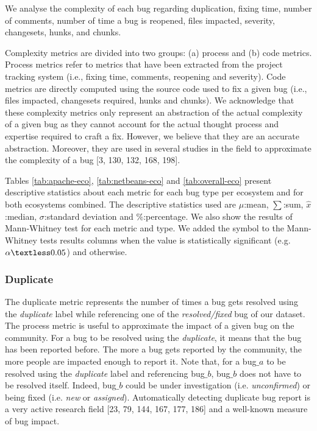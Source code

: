 \documentclass[12pt]{report}
\newcommand{\xmark}{\ding{55}}%
\begin{document}
We analyse the complexity of each bug regarding duplication, fixing
time, number of comments, number of time a bug is reopened, files
impacted, severity, changesets, hunks, and chunks.

Complexity metrics are divided into two groups: (a) process and (b) code
metrics. Process metrics refer to metrics that have been extracted from
the project tracking system (i.e., fixing time, comments, reopening and
severity). Code metrics are directly computed using the source code used
to fix a given bug (i.e., files impacted, changesets required, hunks and
chunks). We acknowledge that these complexity metrics only represent an
abstraction of the actual complexity of a given bug as they cannot
account for the actual thought process and expertise required to craft a
fix. However, we believe that they are an accurate abstraction.
Moreover, they are used in several studies in the field to approximate
the complexity of a bug {[}3, 130, 132, 168, 198{]}.

Tables \ref{tab:apache-eco}, \ref{tab:netbeans-eco} and
\ref{tab:overall-eco} present descriptive statistics about each metric
for each bug type per ecosystem and for both ecosystems combined. The
descriptive statistics used are \(\mu\):mean, \(\sum\):sum,
\(\hat{x}\):median, \(\sigma\):standard deviation and \(\%\):percentage.
We also show the results of Mann-Whitney test for each metric and type.
We added the \checkmark symbol to the Mann-Whitney tests results columns
when the value is statistically significant (e.g.
\(\alpha \textless 0.05\)) and \xmark otherwise.

 


\subsubsection{Duplicate}\label{duplicate}

The duplicate metric represents the number of times a bug gets resolved
using the \emph{duplicate} label while referencing one of the
\emph{resolved/fixed} bug of our dataset. The process metric is useful
to approximate the impact of a given bug on the community. For a bug to
be resolved using the \emph{duplicate}, it means that the bug has been
reported before. The more a bug gets reported by the community, the more
people are impacted enough to report it. Note that, for a bug\(\_a\) to
be resolved using the \emph{duplicate} label and referencing bug\(\_b\),
bug\(\_b\) does not have to be resolved itself. Indeed, bug\(\_b\) could
be under investigation (i.e. \emph{unconfirmed}) or being fixed (i.e.
\emph{new} or \emph{assigned}). Automatically detecting duplicate bug
report is a very active research field {[}23, 79, 144, 167, 177, 186{]}
and a well-known measure of bug impact.
\end{document}
